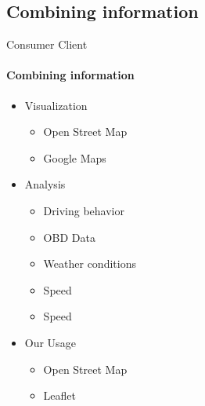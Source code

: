 \subsection{Combining information}

\begin{frame}{Consumer Client}
    \framesubtitle{Combining information}
    \begin{itemize}
        \item<1-> Visualization
        \begin{itemize}
            \item<2-> Open Street Map
            \item<2-> Google Maps
        \end{itemize}

        \item<1-> Analysis
        \begin{itemize}
            \item<3-> Driving behavior
            \item<3-> OBD Data
            \item<3-> Weather conditions
            \item<3-> Speed
            \item<3-> Speed
        \end{itemize}

        \item<1-> Our Usage
        \begin{itemize}
            \item<4-> Open Street Map
            \item<4-> Leaflet
        \end{itemize}
    \end{itemize}

\end{frame}